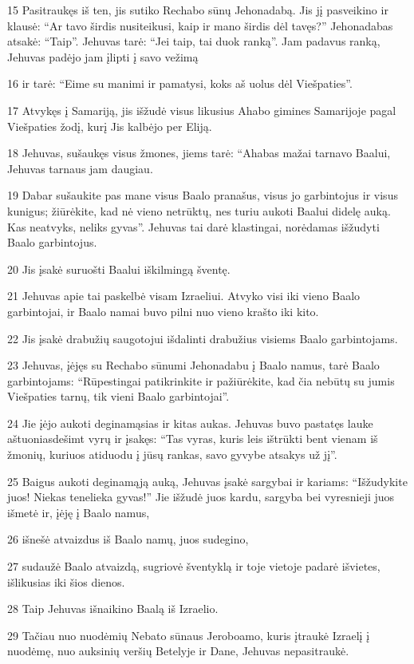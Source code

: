 \par 15 Pasitraukęs iš ten, jis sutiko Rechabo sūnų Jehonadabą. Jis jį pasveikino ir klausė: “Ar tavo širdis nusiteikusi, kaip ir mano širdis dėl tavęs?” Jehonadabas atsakė: “Taip”. Jehuvas tarė: “Jei taip, tai duok ranką”. Jam padavus ranką, Jehuvas padėjo jam įlipti į savo vežimą 
\par 16 ir tarė: “Eime su manimi ir pamatysi, koks aš uolus dėl Viešpaties”. 
\par 17 Atvykęs į Samariją, jis išžudė visus likusius Ahabo gimines Samarijoje pagal Viešpaties žodį, kurį Jis kalbėjo per Eliją. 
\par 18 Jehuvas, sušaukęs visus žmones, jiems tarė: “Ahabas mažai tarnavo Baalui, Jehuvas tarnaus jam daugiau. 
\par 19 Dabar sušaukite pas mane visus Baalo pranašus, visus jo garbintojus ir visus kunigus; žiūrėkite, kad nė vieno netrūktų, nes turiu aukoti Baalui didelę auką. Kas neatvyks, neliks gyvas”. Jehuvas tai darė klastingai, norėdamas išžudyti Baalo garbintojus. 
\par 20 Jis įsakė suruošti Baalui iškilmingą šventę. 
\par 21 Jehuvas apie tai paskelbė visam Izraeliui. Atvyko visi iki vieno Baalo garbintojai, ir Baalo namai buvo pilni nuo vieno krašto iki kito. 
\par 22 Jis įsakė drabužių saugotojui išdalinti drabužius visiems Baalo garbintojams. 
\par 23 Jehuvas, įėjęs su Rechabo sūnumi Jehonadabu į Baalo namus, tarė Baalo garbintojams: “Rūpestingai patikrinkite ir pažiūrėkite, kad čia nebūtų su jumis Viešpaties tarnų, tik vieni Baalo garbintojai”. 
\par 24 Jie įėjo aukoti deginamąsias ir kitas aukas. Jehuvas buvo pastatęs lauke aštuoniasdešimt vyrų ir įsakęs: “Tas vyras, kuris leis ištrūkti bent vienam iš žmonių, kuriuos atiduodu į jūsų rankas, savo gyvybe atsakys už jį”. 
\par 25 Baigus aukoti deginamąją auką, Jehuvas įsakė sargybai ir kariams: “Išžudykite juos! Niekas tenelieka gyvas!” Jie išžudė juos kardu, sargyba bei vyresnieji juos išmetė ir, įėję į Baalo namus, 
\par 26 išnešė atvaizdus iš Baalo namų, juos sudegino, 
\par 27 sudaužė Baalo atvaizdą, sugriovė šventyklą ir toje vietoje padarė išvietes, išlikusias iki šios dienos. 
\par 28 Taip Jehuvas išnaikino Baalą iš Izraelio. 
\par 29 Tačiau nuo nuodėmių Nebato sūnaus Jeroboamo, kuris įtraukė Izraelį į nuodėmę, nuo auksinių veršių Betelyje ir Dane, Jehuvas nepasitraukė. 
